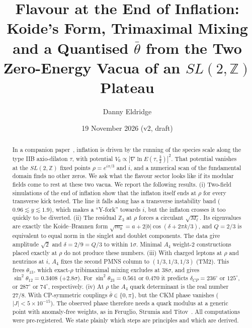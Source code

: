 \documentclass[aps,prd,twocolumn,superscriptaddress,nofootinbib,showkeys]{revtex4-2}
\begin{document}
\title{Flavour at the End of Inflation: Koide's Form, Trimaximal Mixing and a Quantised $\bar\theta$ from the Two Zero-Energy Vacua of an $SL(2,\mathbb Z)$ Plateau}
\author{Danny Eldridge}
\date{19 November 2026 (v2, draft)}
\begin{abstract}
In a companion paper~\cite{P1}, inflation is driven by the running of the species scale along the type IIB axio-dilaton $\tau$, with potential $V_0\propto|\nabla\ln E(\tau,\tfrac32)|^2$. That potential vanishes at the $SL(2,\mathbb Z)$ fixed points $\rho=e^{i\pi/3}$ and $i$, and a numerical scan of the fundamental domain finds no other zeros. We ask what the flavour sector looks like if its modular fields come to rest at these two vacua. We report the following results.
(i) Two-field simulations of the end of inflation show that the inflaton itself ends at $\rho$ for every transverse kick tested. The line it falls along has a transverse instability band ($0.96\lesssim y\lesssim1.9$), which makes a ``Y-fork'' towards $i$, but the inflaton crosses it too quickly to be diverted.
(ii) The residual $\mathbb Z_3$ at $\rho$ forces a circulant $\sqrt{M_\ell}$. Its eigenvalues are exactly the Koide--Brannen form $\sqrt{m_k}=a+2|b|\cos(\delta+2\pi k/3)$, and $Q=2/3$ is equivalent to equal norm in the singlet and doublet components. The data give amplitude $\sqrt2$ and $\delta=2/9=Q/3$ to within $1\sigma$. Minimal $A_4$ weight-2 constructions placed exactly at $\rho$ do not produce these numbers.
(iii) With charged leptons at $\rho$ and neutrinos at $i$, $A_4$ fixes the second PMNS column to $(1/3,1/3,1/3)$ (TM2). This frees $\theta_{13}$, which exact-$\rho$ tribimaximal mixing excludes at $38\sigma$, and gives $\sin^2\theta_{12}=0.3408$ ($+2.8\sigma$). For $\sin^2\theta_{23}=0.561$ or $0.470$ it predicts $\delta_{CP}=236^\circ$ or $125^\circ$, or $287^\circ$ or $74^\circ$, respectively.
(iv) At $\rho$ the $A_4$ quark determinant is the real number $27/8$. With CP-symmetric couplings $\bar\theta\in\{0,\pi\}$, but the CKM phase vanishes ($|J|<5\times10^{-15}$). The observed phase therefore needs a quark modulus at a generic point with anomaly-free weights, as in Feruglio, Strumia and Titov~\cite{FST}.
All computations were pre-registered. We state plainly which steps are principles and which are derived.
\end{abstract}
\maketitle
\end{document}
